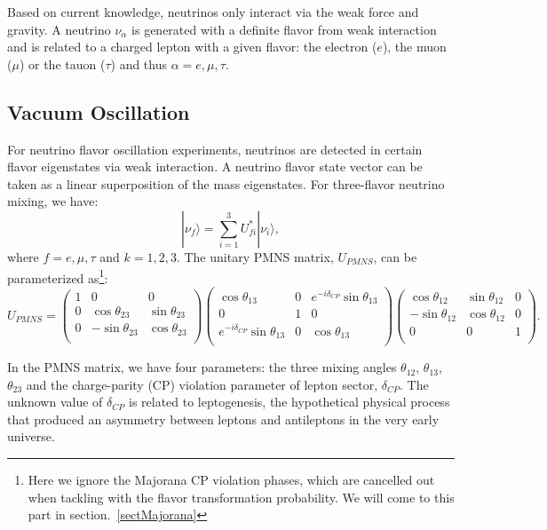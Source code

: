 Based on current knowledge, neutrinos only interact via the weak force and gravity. A neutrino $\nu_\alpha$ is generated with a definite flavor from weak interaction and is related to a charged lepton with a given flavor: the electron ($e$), the muon ($\mu$) or the tauon ($\tau$) and thus $\alpha=e,\mu,\tau$.

\subsection{Vacuum Oscillation}\label{sectVacuumOsci}
For neutrino flavor oscillation experiments, neutrinos are detected in certain flavor eigenstates via weak interaction. A neutrino flavor state vector can be taken as a linear superposition of the mass eigenstates. For three-flavor neutrino mixing, we have\cite{pdg2018}:
\begin{equation}\label{eq:mixingmatrix}
|\nu_f\rangle = \sum_{i=1}^3U^*_{fi}|\nu_i\rangle, 
\end{equation}
where $f=e,\mu,\tau$ and $k=1,2,3$. The unitary PMNS matrix, $U_{PMNS}$, can be parameterized as\footnote{Here we ignore the Majorana CP violation phases, which are cancelled out when tackling with the flavor transformation probability. We will come to this part in section.~\ref{sectMajorana}}: 
\begin{equation}\label{eq:uPMNS}
U_{PMNS} =
\begin{pmatrix}
1 &0 &0\\
0 &\cos\theta_{23} &\sin\theta_{23}\\
0 &-\sin\theta_{23} &\cos\theta_{23}\\ 
\end{pmatrix}
\begin{pmatrix}
\cos\theta_{13} &0 &e^{-i\delta_{CP}}\sin\theta_{13}\\
0 &1 &0\\
e^{-i\delta_{CP}}\sin\theta_{13} &0 &\cos\theta_{13}\\ 
\end{pmatrix}
\begin{pmatrix}
\cos\theta_{12} &\sin\theta_{12} &0\\
-\sin\theta_{12} &\cos\theta_{12} &0\\
0 &0 &1\\ 
\end{pmatrix}.
\end{equation}

In the PMNS matrix, we have four parameters: the three mixing angles $\theta_{12}$, $\theta_{13}$, $\theta_{23}$ and the charge-parity (CP) violation parameter of lepton sector, $\delta_{CP}$. The unknown value of $\delta_{CP}$ is related to leptogenesis, the hypothetical physical process that produced an asymmetry between leptons and antileptons in the very early universe\cite{wiki_cp}. 

